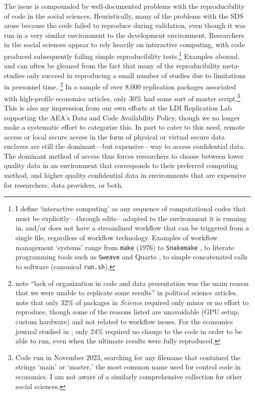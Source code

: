 \documentclass[inline]{hdsr}
\begin{document}
The issue is compounded by well-documented problems with the reproducibility of code in the social sciences. Heuristically, many of the problems with the SDS arose because the code failed to reproduce during validation, even though it was  run in a very similar environment to the development environment. Researchers in the social sciences appear to rely heavily on interactive computing, with code produced subsequently failing simple reproducibility tests.\footnote{I define `interactive computing' as any sequence of computational codes that must be explicitly---through edits---adapted to the environment it is running in, and/or does not have a streamlined workflow that can be triggered from a single file, regardless of workflow technology. Examples of workflow management `systems' range from \texttt{make} (1976) \citep{association_for_computing_machinery_acm_2003} to \texttt{Snakemake} \citep{molder_sustainable_2021}, to literate programming tools such as \texttt{Sweave} \citep{Leisch2002SweaveDG} and Quarto \citep{Allaire_Quarto_2024}, to simple concatenated calls to software (canonical \texttt{run.sh}). } Examples abound, and can often be gleaned from the fact that many of the reproducibility meta-studies only succeed in reproducing a small number of studies due to limitations in personnel time.%
\footnote{\citet{stockemer_data_2018} note ``lack of organization in code and data presentation was the main reason that we were unable to replicate some results'' in political science articles. \citet{StoddenPNAS2018} note that only 32\% of packages in \textit{Science} required only minor or no effort to reproduce, though some of the reasons listed are unavoidable (GPU setup, custom hardware) and not related to workflow issues. For the economics journal studied in \citet{herbert_reproduce_2024}, only 24\% required no change to the code in order to be able to run, even when the ultimate results were fully reproduced.}
%
In a sample of over 8,000 replication packages associated with high-profile economics articles, only 30\% had some sort of master script.\footnote{Code run in November 2023, searching for any filename that contained the strings `main' or `master,' the most common name used for control code in economics. I am not aware of a similarly comprehensive collection for other social sciences.} This is also my impression from our own efforts at the \acl{LDI} Replication Lab supporting the \acl{AEA}'s Data and Code Availability Policy, though we no longer make a systematic effort to categorize this.  In part to cater to this need, remote access or local secure access in the form of physical or virtual secure data enclaves are still the dominant---but expensive---way to access confidential data. The dominant method of access thus forces researchers to choose between lower quality data in an environment that corresponds to their preferred computing method, and higher quality confidential data in environments that are expensive for researchers, data providers, or both.
\end{document}
